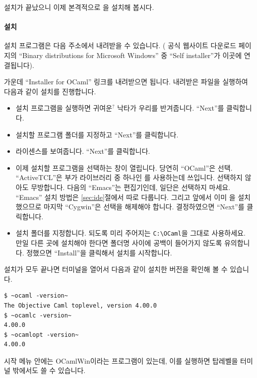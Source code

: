 \CYGWIN{} 설치가 끝났으니 이제 본격적으로 \OCAML{}을 설치해 봅시다.

\paragraph{\OCAML{} 설치} \OCAML{} 설치 프로그램은 다음 주소에서
내려받을 수 있습니다. (\OCAML{} 공식 웹사이트 다운로드 페이지의 ``Binary
distributions for Microsoft Windows'' 중 ``Self installer''가 이곳에 연결됩니다).

\begin{center}
\end{center}

가운데 ``Installer for OCaml'' 링크를 내려받으면 됩니다. 내려받은 파일을
실행하여 다음과 같이 설치를 진행합니다.

\begin{itemize}
\item 설치 프로그램을 실행하면 귀여운$^?$ 낙타가 우리를 반겨줍니다. ``Next''를
  클릭합니다.
\item 설치할 프로그램 폴더를 지정하고 ``Next''를 클릭합니다.
\item \OCAML{} 라이센스를 보여줍니다. ``Next''를 클릭합니다.
\item 이제 설치할 프로그램을 선택하는 창이 열립니다. 당연히 ``OCaml''은
  선택. ``ActiveTCL''은 부가 라이브러리 중 하나인 \LABLTK{}를
  사용하는데 쓰입니다. 선택하지 않아도 무방합니다. 다음의 ``Emacs''는
  편집기인데, 일단은 선택하지 마세요. ``Emacs'' 설치 방법은
  \ref{sec:ide}절에서 따로 다룹니다. 그리고 앞에서 이미 \CYGWIN{}을
  설치했으므로 마지막 ``Cygwin''은 선택을 해제해야 합니다. 결정하였으면
  ``Next''를 클릭합니다.
\item \OCAML{} 설치 폴더를 지정합니다. 되도록 미리 주어지는
  \texttt{C:\textbackslash OCaml}을 그대로 사용하세요. 만일 다른 곳에 설치해야
  한다면 폴더명 사이에 공백이 들어가지 않도록 유의합니다. 정했으면
  ``Install''을 클릭해서 설치를 시작합니다.
\end{itemize}

설치가 모두 끝나면 \CYGWIN{} 터미널을 열어서 다음과 같이 설치한 \OCAML{}
버전을 확인해 볼 수 있습니다.

\begin{lstlisting}
$ ~ocaml -version~
The Objective Caml toplevel, version 4.00.0
$ ~ocamlc -version~
4.00.0
$ ~ocamlopt -version~
4.00.0
\end{lstlisting}

시작 메뉴 안에는 \textsf{OCamlWin}이라는 프로그램이 있는데, 이를 실행하면
\OCAML{} 탑레벨을 터미널 밖에서도 쓸 수 있습니다.

